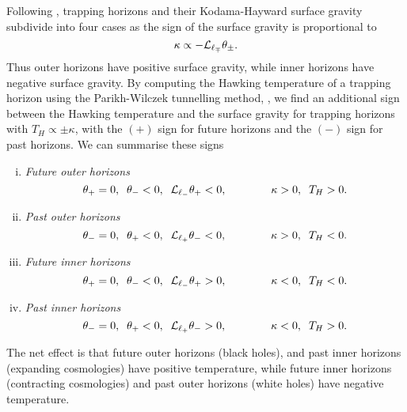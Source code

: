 Following \cite{Binetruy:2014ela, Helou:2015zma}, trapping horizons and their Kodama-Hayward surface gravity subdivide into four cases as the sign of the surface gravity is proportional to
\begin{equation*}
	\kappa \propto -  {\cal L}_{\ell_\mp} \theta_\pm.
\end{equation*}
Thus outer horizons have positive surface gravity, while inner horizons have negative surface gravity. By computing the Hawking temperature of a trapping horizon using the Parikh-Wilczek tunnelling method,   \cite{Parikh:1999mf, Binetruy:2014ela, Helou:2015zma}, we find an additional sign between the Hawking temperature and the surface gravity for trapping horizons with $T_H \propto \pm \kappa$, with the $(+)$ sign for future horizons and the $(-)$ sign for past horizons. We can summarise these signs
\begin{enumerate}[(i)]
	\item \emph{Future outer horizons}
	\begin{equation*}
		\theta_+ = 0, \;\; \theta_- < 0, \;\; {\cal L}_{\ell_-} \theta_+ < 0, \qquad  \qquad\kappa > 0, \;\; T_H > 0.
	\end{equation*}
	\item \emph{Past outer horizons}
	\begin{equation*}
		\theta_- = 0, \;\; \theta_+ < 0, \;\; {\cal L}_{\ell_+} \theta_-  < 0, \qquad \qquad \kappa >  0, \;\; T_H < 0.
	\end{equation*}
		\item \emph{Future inner horizons}
	\begin{equation*}
		\theta_+ = 0, \;\; \theta_- < 0, \;\; {\cal L}_{\ell_-} \theta_+ > 0, \qquad \qquad \kappa <  0, \;\; T_H < 0.
	\end{equation*}
	\item \emph{Past inner horizons}
	\begin{equation*}
		\theta_- = 0, \;\; \theta_+ < 0, \;\; {\cal L}_{\ell_+} \theta_-  > 0, \qquad \qquad \kappa <  0, \;\; T_H > 0.
	\end{equation*}
\end{enumerate}
The net effect is that future outer horizons (black holes), and past inner horizons (expanding cosmologies) have positive temperature, while future inner horizons (contracting cosmologies) and past outer horizons (white holes) have negative temperature. 

